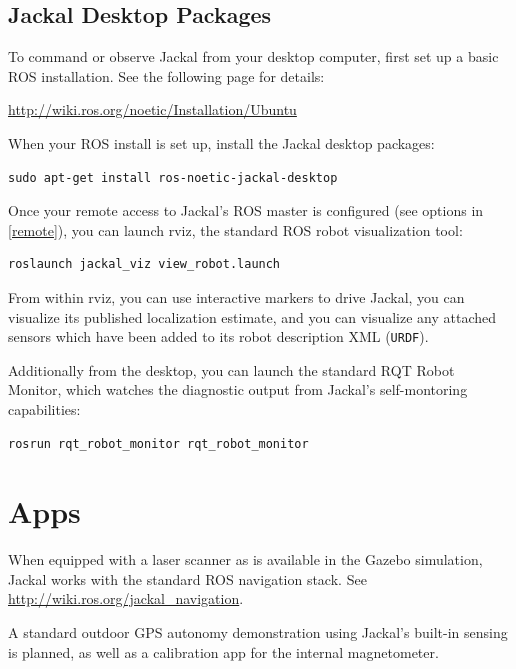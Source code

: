 \documentclass[]{clearpath-latex/clearpath-manual}
\begin{document}
\newpage\subsection{Jackal Desktop Packages}

To command or observe Jackal from your desktop computer, first set up a basic
ROS installation. See the following page for details:

\url{http://wiki.ros.org/noetic/Installation/Ubuntu}

When your ROS install is set up, install the Jackal desktop packages:

\begin{lstlisting}
sudo apt-get install ros-noetic-jackal-desktop
\end{lstlisting}

Once your remote access to Jackal's ROS master is configured (see options in \autoref{remote}),
you can launch rviz, the standard ROS robot visualization tool:

\begin{lstlisting}
roslaunch jackal_viz view_robot.launch
\end{lstlisting}

From within rviz, you can use interactive markers to drive Jackal, you can visualize its
published localization estimate, and you can visualize any attached sensors which have been
added to its robot description XML (\lstinline{URDF}).

Additionally from the desktop, you can launch the standard RQT Robot Monitor, which
watches the diagnostic output from Jackal's self-montoring capabilities:

\begin{lstlisting}
rosrun rqt_robot_monitor rqt_robot_monitor
\end{lstlisting}



\section{Apps}

When equipped with a laser scanner as is available in the Gazebo simulation, Jackal works with the
standard ROS navigation stack. See \url{http://wiki.ros.org/jackal_navigation}.

A standard outdoor GPS autonomy demonstration using Jackal's built-in sensing is planned, as well
as a calibration app for the internal magnetometer.
\end{document}
